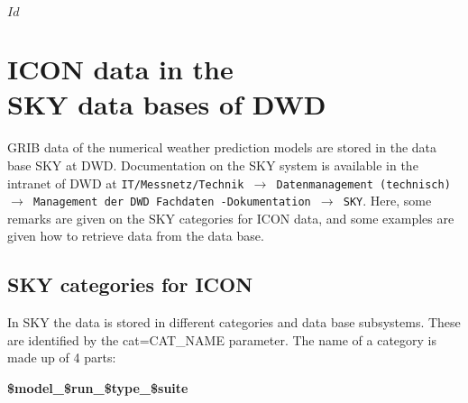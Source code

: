 \svnInfo $Id$
\chapter[ICON data in the SKY data bases of DWD]{ICON data in the\\SKY data bases of DWD}
\label{section:icon_in_sky}


GRIB data of the numerical weather prediction models are stored in the data base
SKY at DWD.
Documentation on the SKY system is available in the intranet of DWD at
{\tt IT/Messnetz/Technik $\rightarrow$ Datenmanagement (technisch) $\rightarrow$
Management der DWD Fachdaten -Dokumentation $\rightarrow$ SKY}.
Here, some remarks are given on the SKY categories for ICON data, and some
examples are given how to retrieve data from the data base.

\section{SKY categories for ICON}\label{sec_skycat}

In SKY the data is stored in different categories and data base subsystems.
These are identified by the cat=CAT\_NAME parameter.
The name of a category is made up of 4 parts:

\begin{center}
 \begin{minipage}{0.25\textwidth}
  \centering
  \textbf{\${model}\_\${run}\_\${type}\_\${suite}}
 \end{minipage}
\end{center}
 
